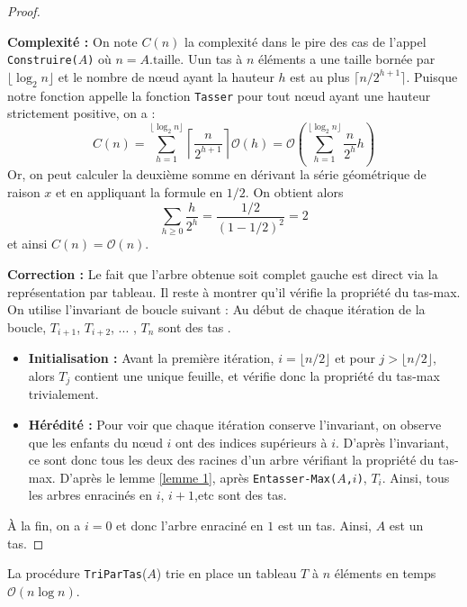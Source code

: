 \begin{proof}~

\textbf{Complexité :} On note $C(n)$ la complexité dans le pire des cas de l'appel {\tt Construire($A$)} où $n = A.\text{taille}$. Uun tas à $n$ éléments a une taille bornée par $\lfloor\log_2 n\rfloor$ et le nombre de nœud ayant la hauteur $h$ est au plus $\lceil n/2^{h+1} \rceil$. Puisque notre fonction appelle la fonction \texttt{Tasser} pour tout nœud ayant une hauteur strictement positive, on a :
$$
C(n) = \sum_{h=1}^{\lfloor \log_2 n \rfloor} \left\lceil \frac{n}{2^{h+1}} \right\rceil \mathcal{O}(h) = \mathcal{O} \left(\sum_{h=1}^{\lfloor \log_2 n \rfloor} \frac{n}{2^{h}} h \right)
$$
Or, on peut calculer la deuxième somme en dérivant la série géométrique de raison $x$ et en appliquant la formule en $1/2$. On obtient alors 
$$
\sum_{h\geq 0} \frac{h}{2^h} = \frac{1/2}{(1-1/2)^2}=2
$$
et ainsi $C(n) = \mathcal{O}(n)$.


\textbf{Correction :} Le fait que l'arbre obtenue soit complet gauche est direct via la représentation par tableau. Il reste à montrer qu'il vérifie la propriété du tas-max. On utilise l’invariant de boucle suivant : \og Au début de chaque itération de la boucle, $T_{i + 1}$, $T_{i + 2}$, ... , $T_n$ sont des tas \fg.
\begin{itemize}
\item \textbf{Initialisation :} Avant la première itération, $i=\lfloor n/2 \rfloor$ et pour $j > \lfloor n/2 \rfloor$, alors $T_j$ contient une unique feuille, et vérifie donc la propriété du tas-max trivialement.
\item \textbf{Hérédité :} Pour voir que chaque itération conserve l’invariant, on observe que les enfants du nœud $i$ ont des indices supérieurs à $i$. D’après l’invariant, ce sont donc tous les deux des racines d'un arbre vérifiant la propriété du tas-max. D'après le lemme \ref{lemme 1}, après \texttt{Entasser-Max($A$,$i$)}, $T_i$. Ainsi, tous les arbres enracinés en $i$, $i+1$,etc sont des tas.
\end{itemize}
À la fin, on a $i=0$ et donc l'arbre enraciné en $1$ est un tas. Ainsi, $A$ est un tas.

\end{proof}


\begin{theorem}
La procédure \texttt{TriParTas}($A$) trie en place un tableau $T$ à $n$ éléments en temps $\mathcal{O}(n\log n)$.
\end{theorem}

